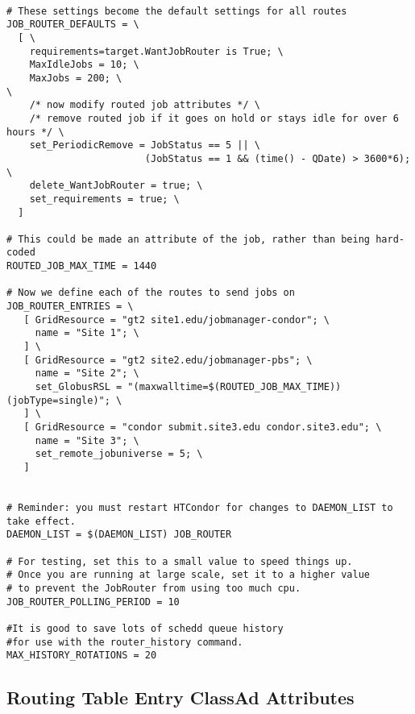 \footnotesize
\begin{verbatim}

# These settings become the default settings for all routes
JOB_ROUTER_DEFAULTS = \
  [ \
    requirements=target.WantJobRouter is True; \
    MaxIdleJobs = 10; \
    MaxJobs = 200; \
\
    /* now modify routed job attributes */ \
    /* remove routed job if it goes on hold or stays idle for over 6 hours */ \
    set_PeriodicRemove = JobStatus == 5 || \
                        (JobStatus == 1 && (time() - QDate) > 3600*6); \
    delete_WantJobRouter = true; \
    set_requirements = true; \
  ]

# This could be made an attribute of the job, rather than being hard-coded
ROUTED_JOB_MAX_TIME = 1440

# Now we define each of the routes to send jobs on
JOB_ROUTER_ENTRIES = \
   [ GridResource = "gt2 site1.edu/jobmanager-condor"; \
     name = "Site 1"; \
   ] \
   [ GridResource = "gt2 site2.edu/jobmanager-pbs"; \
     name = "Site 2"; \
     set_GlobusRSL = "(maxwalltime=$(ROUTED_JOB_MAX_TIME))(jobType=single)"; \
   ] \
   [ GridResource = "condor submit.site3.edu condor.site3.edu"; \
     name = "Site 3"; \
     set_remote_jobuniverse = 5; \
   ]


# Reminder: you must restart HTCondor for changes to DAEMON_LIST to take effect.
DAEMON_LIST = $(DAEMON_LIST) JOB_ROUTER

# For testing, set this to a small value to speed things up.
# Once you are running at large scale, set it to a higher value
# to prevent the JobRouter from using too much cpu.
JOB_ROUTER_POLLING_PERIOD = 10

#It is good to save lots of schedd queue history
#for use with the router_history command.
MAX_HISTORY_ROTATIONS = 20
\end{verbatim}
\normalsize



\subsection{\label{RoutingTableAttributes} Routing Table Entry ClassAd Attributes}

